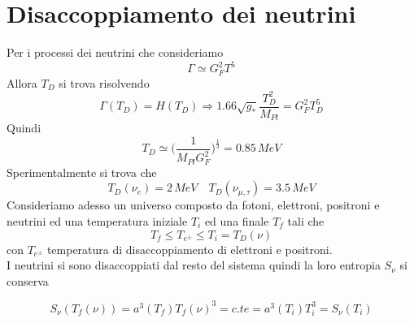 \documentclass[10pt,a4paper]{article}
\let\oldmarginpar\marginpar
\renewcommand\marginpar[1]{\-\oldmarginpar[\raggedleft\footnotesize #1]%
	{\raggedright\footnotesize #1}}
\theoremstyle{break}
\theoremstyle{remark}
\theoremstyle{definition}
\newcommand{\ra}{\Rightarrow}
\begin{document}
\section{Disaccoppiamento dei neutrini}
Per i processi dei neutrini che consideriamo
\marginpar{$G_F = \frac{1}{292,8}\, GeV^{-2}$}
\[
\Gamma \simeq G_F^2 T^5
\]
Allora $T_D$ si trova risolvendo
\[
\Gamma(T_D) = H(T_D) \ra 1.66 \sqrt{g_*} \frac{T_D^2}{M_{Pl}} = G_F^2 T_D^5
\]
Quindi
\[
T_D \simeq \bigg(\frac{1}{M_{Pl} G_F^2}\bigg)^\frac13 = 0.85 \, MeV
\]
Sperimentalmente si trova che 
\[
T_D(\nu_e) = 2\, MeV \quad T_D(\nu_{\mu, \tau}) = 3.5 \, MeV
\]
Consideriamo adesso un universo composto da fotoni, elettroni, positroni e neutrini ed una temperatura iniziale $T_i$ ed una finale $T_f$ tali che
\[
T_f \le T_{e^\pm} \le T_i = T_D(\nu)
\]
con $T_{e^\pm}$ temperatura di disaccoppiamento di elettroni e positroni. \\
I neutrini si sono disaccoppiati dal resto del sistema quindi la loro entropia $S_\nu$ si conserva

\[
S_\nu(T_f(\nu)) = a^3(T_f)T_f(\nu)^3 = c.te = a^3(T_i) T_i^3 = S_\nu(T_i) 
\]
\end{document}
